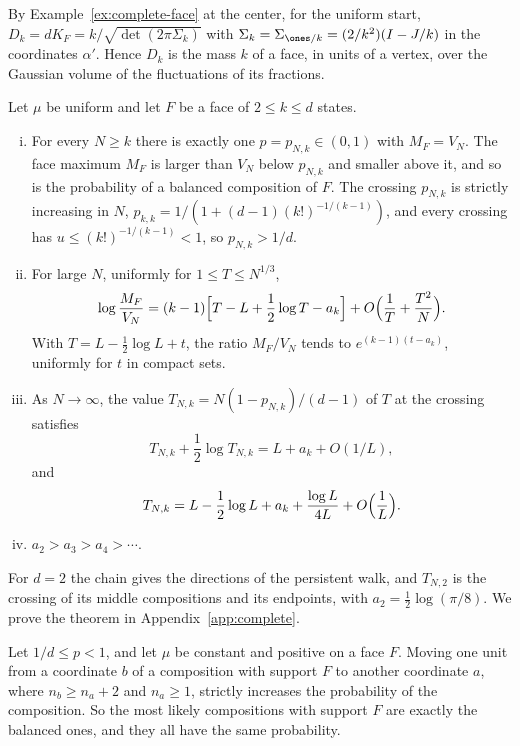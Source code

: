 By Example~\ref{ex:complete-face} at the center, for the uniform start, $D_k=dK_F=k/\sqrt{\det(2\pi\Sigma_k)}$ with
$\Sigma_k=\Sigma_{\ones/k}=(2/k^2)(I-J/k)$ in the coordinates $\alpha'$. Hence $D_k$ is the mass $k$
of a face, in units of a vertex, over the Gaussian volume of the fluctuations of its
fractions.

\begin{theorem}\label{thm:simplex-crossing}
Let $\mu$ be uniform and let $F$ be a face of $2\le k\le d$ states.
\begin{enumerate}[(i)]
\item For every $N\ge k$ there is exactly one $p=p_{N,k}\in(0,1)$ with $M_F=V_N$. The face
maximum $M_F$ is larger than $V_N$ below $p_{N,k}$ and smaller above it, and so is the
probability of a balanced composition of $F$. The crossing $p_{N,k}$ is strictly increasing in $N$,
$p_{k,k}=1/(1+(d-1)(k!)^{-1/(k-1)})$, and every crossing has $u\le(k!)^{-1/(k-1)}<1$, so
$p_{N,k}>1/d$.
\item For large $N$, uniformly for $1\le T\le N^{1/3}$,
\[
\log\frac{M_F}{V_N}=(k-1)\Bigl[T-L+\frac12\log T-a_k\Bigr]
+O\Bigl(\frac1T+\frac{T^2}N\Bigr).
\]
With $T=L-\frac12\log L+t$, the ratio $M_F/V_N$ tends to $e^{(k-1)(t-a_k)}$, uniformly for
$t$ in compact sets.
\item As $N\to\infty$, the value $T_{N,k}=N(1-p_{N,k})/(d-1)$ of $T$ at the crossing satisfies
\[
T_{N,k}+\frac12\log T_{N,k}=L+a_k+O(1/L),
\]
and
\begin{equation}\label{eq:simplex-root-expansion}
T_{N,k}=L-\frac12\log L+a_k+\frac{\log L}{4L}+O\Bigl(\frac1L\Bigr).
\end{equation}
\item $a_2>a_3>a_4>\cdots$.
\end{enumerate}
\end{theorem}

For $d=2$ the chain gives the directions of the persistent walk, and $T_{N,2}$ is the
crossing of its middle compositions and its endpoints, with $a_2=\frac12\log(\pi/8)$. We prove the theorem
in Appendix~\ref{app:complete}.

\begin{theorem}\label{thm:simplex-balance}
Let $1/d\le p<1$, and let $\mu$ be constant and positive on a face $F$. Moving one unit from a
coordinate $b$ of a composition with support $F$ to another coordinate $a$, where $n_b\ge n_a+2$ and
$n_a\ge1$, strictly increases the probability of the composition. So the most likely compositions with support
$F$ are exactly the balanced ones, and they all have the same probability.
\end{theorem}

